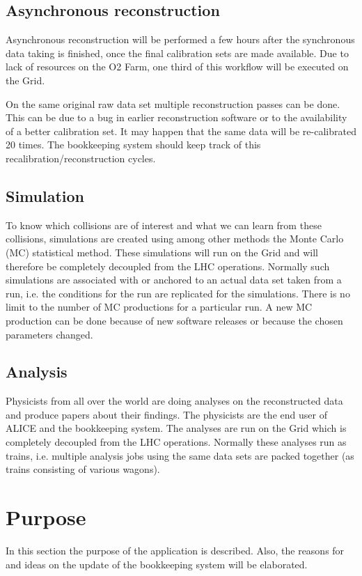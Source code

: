 \subsection{Asynchronous reconstruction}
Asynchronous reconstruction will be performed a few hours after the synchronous data taking is finished, once the final calibration sets are made available. Due to lack of resources on the O2 Farm, one third of this workflow will be executed on the Grid. 

On the same original raw data set multiple reconstruction passes can be done. This can be due to a bug in earlier reconstruction software or to the availability of a better calibration set. It may happen that the same data will be re-calibrated 20 times. The bookkeeping system should keep track of this recalibration/reconstruction cycles.

\subsection{Simulation}
To know which collisions are of interest and what we can learn from these collisions, simulations are created using among other methods the Monte Carlo (MC) statistical method. These simulations will run on the Grid and will therefore be completely decoupled from the LHC operations. Normally such simulations are associated with or anchored to an actual data set taken from a run, i.e. the conditions for the run are replicated for the simulations. There is no limit to the number of MC productions for a particular run. A new MC production can be done because of new software releases or because the chosen parameters changed.

\subsection{Analysis}
Physicists from all over the world are doing analyses on the reconstructed data and produce papers about their findings. The physicists are the end user of ALICE and the bookkeeping system. The analyses are run on the Grid which is completely decoupled from the LHC operations. Normally these analyses run as trains, i.e. multiple analysis jobs using the same data sets are packed together (as trains consisting of various wagons).


\section{Purpose}
In this section the purpose of the application is described. Also, the reasons for and ideas on the update of the bookkeeping system will be elaborated.

